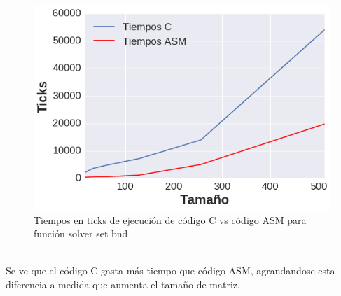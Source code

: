 \begin{figure}[h]

\centering
\includegraphics[scale=0.6] {grafica_set_bound}
  
 \caption{Tiempos en ticks de ejecución de código C vs código ASM para función solver set bnd}
\end{figure} \\
Se ve que el código C gasta más tiempo que código ASM, agrandandose esta diferencia a medida que aumenta el tamaño de matriz.

